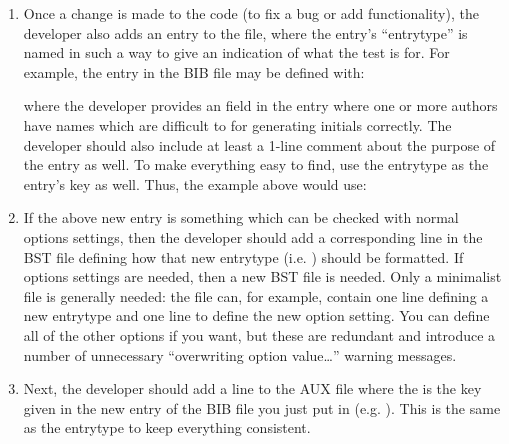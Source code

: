 \documentclass[letterpaper,10pt,english]{sphinxmanual}
\begin{document}
\begin{enumerate}
\item {} 
Once a change is made to the code (to fix a bug or add functionality), the developer also adds an entry to the  file, where the entry’s “entrytype” is named in such a way to give an indication of what the test is for. For example, the entry in the BIB file may be defined with:

%
\begin{sphinxVerbatim}[commandchars=\\\{\}]
\end{sphinxVerbatim}

where the developer provides an  field in the entry where one or more authors have names which are difficult to for generating initials correctly. The developer should also include at least a 1-line comment about the purpose of the entry as well. To make everything easy to find, use the entrytype as the entry’s key as well. Thus, the example above would use:

%
\begin{sphinxVerbatim}[commandchars=\\\{\}]
 
\end{sphinxVerbatim}

\item {} 
If the above new entry is something which can be checked with normal options settings, then the developer should add a corresponding line in the BST file defining how that new entrytype (i.e. ) should be formatted. If  options settings are needed, then a new BST file is needed. Only a minimalist file is generally needed: the file can, for example, contain one line defining a new entrytype and one line to define the new option setting. You can define all of the other options if you want, but these are redundant and introduce a number of unnecessary “overwriting option value…” warning messages.

\item {} 
Next, the developer should add a line  to the AUX file where the  is the key given in the new entry of the BIB file you just put in (e.g. ). This is the same as the entrytype to keep everything consistent.


\end{enumerate}
\end{document}

